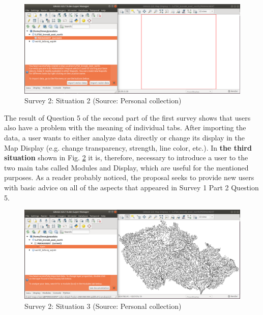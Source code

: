 \documentclass[a4paper,10pt,twoside]{article}
\begin{document}
\vspace{0.3cm}
\begin{figure}[hbt!] 
\begin{center}
\includegraphics[width=17cm]{../pictures/grass_infobar_2.png} 
\caption[Survey 2: Situation 2]{Survey 2: Situation 2 (Source: Personal collection)}
\label{fig:grass_infobar_2}
\end{center}
\end{figure}

\noindent The result of Question 5 of the second part of the first survey shows that users also have a problem with the meaning of individual tabs. After importing the data, a user wants to either analyze data directly or change its display in the Map Display (e.g. change transparency, strength, line color, etc.). In \textbf{the third situation} shown in Fig. \ref{fig:grass_infobar_3} it is, therefore, necessary to introduce a user to the two main tabs called Modules and Display, which are useful for the mentioned purposes. As a reader probably noticed, the proposal seeks to provide new users with basic advice on all of the aspects that appeared in Survey 1 Part 2 Question 5.

\vspace{0.3cm}
\begin{figure}[hbt!] 
\begin{center}
\includegraphics[width=17cm]{../pictures/grass_infobar_3.png} 
\caption[Survey 2: Situation 3]{Survey 2: Situation 3 (Source: Personal collection)}
\label{fig:grass_infobar_3}
\end{center}
\end{figure}
\end{document}
